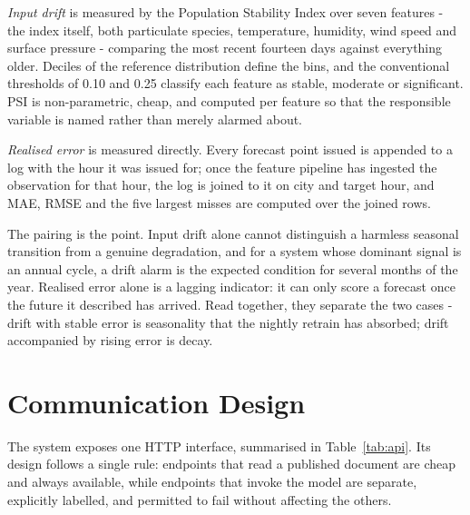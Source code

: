 \emph{Input drift} is measured by the Population Stability Index over seven
features - the index itself, both particulate species, temperature, humidity,
wind speed and surface pressure - comparing the most recent fourteen days against
everything older. Deciles of the reference distribution define the bins, and the
conventional thresholds of 0.10 and 0.25 classify each feature as stable,
moderate or significant. PSI is non-parametric, cheap, and computed per feature so
that the responsible variable is named rather than merely alarmed about.

\emph{Realised error} is measured directly. Every forecast point issued is
appended to a log with the hour it was issued for; once the feature pipeline has
ingested the observation for that hour, the log is joined to it on city and target
hour, and MAE, RMSE and the five largest misses are computed over the joined rows.

The pairing is the point. Input drift alone cannot distinguish a harmless
seasonal transition from a genuine degradation, and for a system whose dominant
signal is an annual cycle, a drift alarm is the expected condition for several
months of the year. Realised error alone is a lagging indicator: it can only
score a forecast once the future it described has arrived. Read together, they
separate the two cases - drift with stable error is seasonality that the nightly
retrain has absorbed; drift accompanied by rising error is decay.

\section{Communication Design}
The system exposes one HTTP interface, summarised in Table~\ref{tab:api}. Its
design follows a single rule: endpoints that read a published document are cheap
and always available, while endpoints that invoke the model are separate,
explicitly labelled, and permitted to fail without affecting the others.

